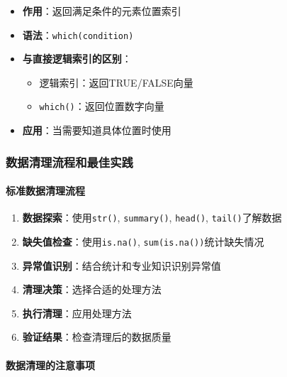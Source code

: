 \documentclass[
]{book}
\providecommand{\tightlist}{%
  \setlength{\itemsep}{0pt}\setlength{\parskip}{0pt}}
\begin{document}
\begin{itemize}
\tightlist
\item
  \textbf{作用}：返回满足条件的元素位置索引
\item
  \textbf{语法}：\texttt{which(condition)}
\item
  \textbf{与直接逻辑索引的区别}：

  \begin{itemize}
  \tightlist
  \item
    逻辑索引：返回TRUE/FALSE向量
  \item
    \texttt{which()}：返回位置数字向量
  \end{itemize}
\item
  \textbf{应用}：当需要知道具体位置时使用
\end{itemize}

\hypertarget{ux6570ux636eux6e05ux7406ux6d41ux7a0bux548cux6700ux4f73ux5b9eux8df5}{%
\subsubsection{数据清理流程和最佳实践}\label{ux6570ux636eux6e05ux7406ux6d41ux7a0bux548cux6700ux4f73ux5b9eux8df5}}

\hypertarget{ux6807ux51c6ux6570ux636eux6e05ux7406ux6d41ux7a0b}{%
\paragraph{标准数据清理流程}\label{ux6807ux51c6ux6570ux636eux6e05ux7406ux6d41ux7a0b}}

\begin{enumerate}
\def\labelenumi{\arabic{enumi}.}
\item
  \textbf{数据探索}：使用\texttt{str()}, \texttt{summary()}, \texttt{head()}, \texttt{tail()}了解数据
\item
  \textbf{缺失值检查}：使用\texttt{is.na()}, \texttt{sum(is.na())}统计缺失情况
\item
  \textbf{异常值识别}：结合统计和专业知识识别异常值
\item
  \textbf{清理决策}：选择合适的处理方法
\item
  \textbf{执行清理}：应用处理方法
\item
  \textbf{验证结果}：检查清理后的数据质量
\end{enumerate}

\hypertarget{ux6570ux636eux6e05ux7406ux7684ux6ce8ux610fux4e8bux9879}{%
\paragraph{数据清理的注意事项}\label{ux6570ux636eux6e05ux7406ux7684ux6ce8ux610fux4e8bux9879}}
\end{document}
